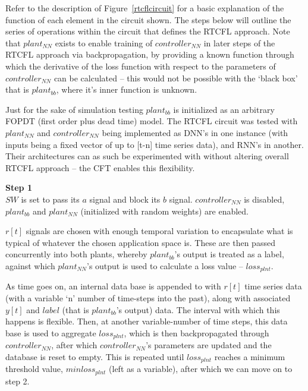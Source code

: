\documentclass[10pt,twocolumn,letterpaper]{article}
\begin{document}
            Refer to the description of Figure~\ref{rtcflcircuit} for a basic explanation of the function of each
            element in the circuit shown. The steps below will outline the series of operations within the circuit that
            defines the RTCFL approach. Note that $plant_{NN}$ exists to enable training of $controller_{NN}$ in later
            steps of the RTCFL approach via backpropagation, by providing a known function through which the derivative
            of the loss function with respect to the parameters of $controller_{NN}$ can be calculated -- this would not
            be possible with the `black box' that is $plant_{bb}$, where it's inner function is unknown. 
            
            Just for the sake of simulation testing $plant_{bb}$ is initialized as an arbitrary FOPDT (first order plus
            dead time) model. The RTCFL circuit was tested with $plant_{NN}$ and $controller_{NN}$ being implemented as
            DNN's in one instance (with inputs being a fixed vector of up to [t-n] time series data), and RNN's in
            another. Their architectures can as such be experimented with without altering overall RTCFL approach -- the
            CFT enables this flexibility.

            \textbf{Step 1}\\
            $SW$ is set to pass its $a$ signal and block its $b$ signal. $controller_{NN}$ is disabled, $plant_{bb}$ and
            $plant_{NN}$ (initialized with random weights) are enabled.

            $r[t]$ signals are chosen with enough temporal variation to encapsulate what is typical of whatever the
            chosen application space is. These are then passed concurrently into both plants, whereby $plant_{bb}$'s
            output is treated as a label, against which $plant_{NN}$'s output is used to calculate a loss value --
            $loss_{plnt}$.

            As time goes on, an internal data base is appended to with $r[t]$ time series data (with a variable `n'
            number of time-steps into the past), along with associated $y[t]$ and $label$ (that is $plant_{bb}$'s
            output) data. The interval with which this happens is flexible. Then, at another variable-number of time
            steps, this data base is used to aggregate $loss_{plnt}$, which is then backpropagated through
            $controller_{NN}$, after which $controller_{NN}$'s parameters are updated and the database is reset to
            empty. This is repeated until $loss_{plnt}$ reaches a minimum threshold value, $minloss_{plnt}$ (left as a
            variable), after which we can move on to step 2.
\end{document}
